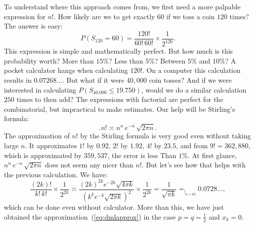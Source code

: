 \documentclass[12pt]{article}
\theoremstyle{definition}
\renewcommand{\leq}{\leqslant}
\begin{document}
To understand where this approach comes from, we first need a more palpable expression for $ n! $. How likely are we to get exactly 60 if we toss a coin $ 120 $ times? The answer is easy:
\[
P(S_{120} = 60) = \frac{120!}{60! \, 60!} \times \frac{1}{2^{120}}.
\]
This expression is simple and mathematically perfect. But how much is this probability worth? More than $ 15 \% $? Less than $ 5 \% $? Between $ 5 \% $ and $ 10 \% $? A pocket calculator hangs when calculating $ 120! $. On a computer this calculation results in $ 0.07268...$. But what if it were $ 40,000 $ coin tosses? And if we were interested in calculating $P(S_{40.000} \leq 19.750)$, would we do a similar calculation $ 250 $ times to then add? The expressions with factorial are perfect for the combinatorial, but impractical to make estimates. Our help will be Stirling's formula:
\[
\bigg.
n! \asymp n^n \, e^{-n} \, \sqrt{2\pi n}.
\]
The approximation of $ n! $ by the Stirling formula is very good even without taking large $ n$. It approximates $ 1! $ by 0.92, $ 2! $ by $ 1.92 $, $ 4! $ by $ 23.5 $, and from $ 9! =  362,880$, which is approximated by $ 359,537 $, the error is less Than $ 1 \% $. At first glance, $ n ^ n \, e^{- n} \, \sqrt {2 \pi n}$ does not seem any nicer than $ n! $. But let's see how that helps with the previous calculation. We have:
\[
\frac{(2k)!}{k!\, k!}\times \frac{1}{2^{2k}}
\asymp
\frac{(2k)^{2k} e^{-2k} \sqrt{4\pi k} }{(k^{k} e^{-k} \sqrt{2\pi k})^2} \times \frac{1}{2^{2k}}
=
\frac{1}{\sqrt{\pi k}}
=_{|_{k=60}}
0.0728...,
\]
which can be done even without calculator. More than this, we have just obtained the approximation~(\ref{eq:dmlapprox}) in the case $ p = q = \frac{1}{2} $ and $ x_k=0 $.
\end{document}
